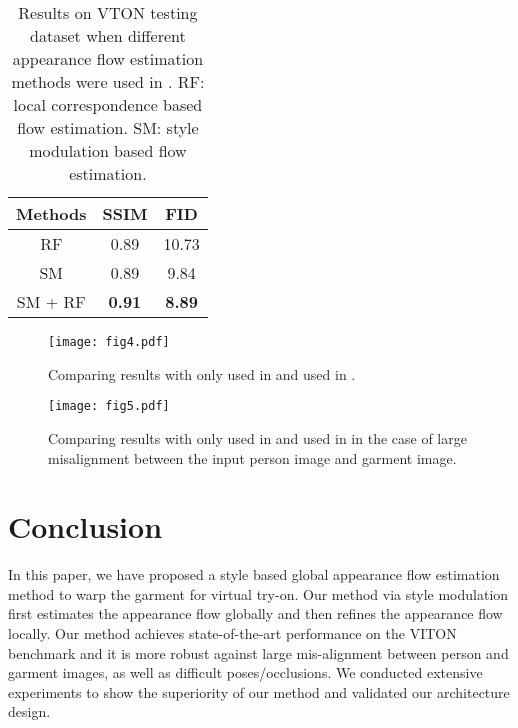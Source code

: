 \documentclass[10pt,twocolumn,letterpaper]{article}
\begin{document}
\begin{table}[ht]
    \centering
    \begin{tabular}{c|c|c}
    \toprule
         Methods & SSIM & FID\\
         \midrule
         RF& 0.89& 10.73\\
         SM& 0.89& 9.84\\
         \midrule
         SM + RF & \textbf{0.91}& \textbf{8.89}\\
         \bottomrule
    \end{tabular}

    \caption{Results on VTON testing dataset  when different appearance flow estimation methods were used in . RF: local correspondence based flow estimation. SM: style modulation based flow estimation.}
    \label{tab:tab4}
    \vspace{-0.4cm}
\end{table}

\begin{figure}[h!]
    \centering
    \texttt{[image: fig4.pdf]}
    \vspace{-0.7cm}
    \caption{Comparing results with only  used in  and  used in .}
    \vspace{-0.2cm}
    \label{fig:fig4}
\end{figure}

\begin{figure}[h!]
    \centering
    \texttt{[image: fig5.pdf]}
    \vspace{-0.5cm}
    \caption{Comparing results with only  used in  and  used in  in the case of large misalignment between the input person image and garment image.}
    \label{fig:fig5}
\end{figure}


\section{Conclusion}
In this paper, we have proposed a style based global appearance flow estimation method to warp the garment for virtual try-on. Our method via style modulation first estimates the appearance flow globally and then refines the appearance flow locally. Our method achieves state-of-the-art performance on the VITON benchmark and it is more robust against large mis-alignment between person and garment images, as well as difficult poses/occlusions. We conducted extensive experiments to show the superiority of our method and validated our architecture design.

{\small


}
\end{document}
